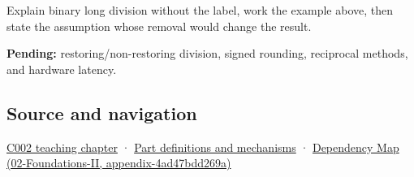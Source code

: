 Explain binary long division without the label, work the example above, then state the assumption whose removal would change the result.

\textbf{Pending:} restoring/non-restoring division, signed rounding, reciprocal methods, and hardware latency.

\subsection{Source and navigation}\label{appendix-89985e6a2685-source-and-navigation}

\hyperref[01-foundations-i-ch001-arithmetic-becomes-a-policy]{C002 teaching chapter} · \hyperref[appendix-fd090d982a15]{Part definitions and mechanisms} · \href{../02-Foundations-II/main.pdf\#nameddest=appendix-4ad47bdd269a}{Dependency Map (02-Foundations-II, appendix-4ad47bdd269a)}
